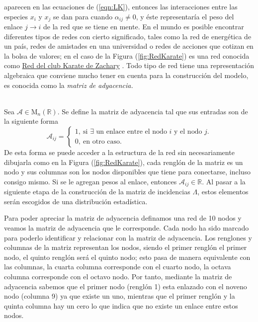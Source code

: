 aparecen en las ecuaciones de (\ref{eqn:LK}), entonces las interacciones entre las especies $x_i$ y $x_j$ se dan para cuando $\alpha_{ij}\neq 0$, y éste representaría el peso del enlace $j\to i$ de la red que se tiene en mente. En el mundo es posible encontrar diferentes tipos de redes con cierto significado, tales como la red de energética de un país, redes de amistades en una universidad o redes de acciones que cotizan en la bolsa de valores; en el caso de la Figura (\ref{fig:RedKarate}) es una red conocida como \href{https://en.wikipedia.org/wiki/Zachary%27s_karate_club}{Red del club Karate de Zachary} \cite{newman2018networks}. Todo tipo de red tiene una representación algebraica que conviene mucho tener en cuenta para la construcción del modelo, es conocida como la \textit{matriz de adyacencia.}\\
\\
\begin{definición}\label{def:matrizdeadyacencia}
	Sea $\mathcal{A}\in\mathrm{M}_n(\mathbb{R}) $. Se define la matriz de adyacencia tal que sus entradas son de la siguiente forma
	$$\mathcal{A}_{ij}= 
	\begin{cases}
		1, \ \text{si $\exists$ un enlace entre el nodo $i$ y el nodo $j$.}\\
		0, \ \text{en otro caso}.
	\end{cases}$$
	De esta forma se puede acceder a la estructura de la red sin necesariamente dibujarla como en la Figura (\ref{fig:RedKarate}), cada renglón de la matriz es un nodo y sus columnas son los nodos disponibles que tiene para conectarse, incluso consigo mismo. Si se le agregan pesos al enlace, entonces $\mathcal{A}_{ij}\in\mathbb{R}$. Al pasar a la siguiente etapa de la construcción de la matriz de incidencias $\Lambda$, estos elementos serán escogidos de una distribución estadística. 
\end{definición}
\begin{ejemplo}
	Para poder apreciar la matriz de adyacencia definamos una red de 10 nodos y veamos la matriz de adyacencia que le corresponde. Cada nodo ha sido marcado para poderlo identificar y relacionar con la matriz de adyacencia. Los renglones y columnas de la matriz representan los nodos, siendo el primer renglón el primer nodo, el quinto renglón será el quinto nodo; esto pasa de manera equivalente con las columnas, la cuarta columna corresponde con el cuarto nodo, la octava columna corresponde con el octavo nodo. Por tanto, mediante la matriz de adyacencia sabemos que el primer nodo (renglón 1) esta enlazado con el noveno nodo (columna 9) ya que existe un uno, mientras que el primer renglón y la quinta columna hay un cero lo que indica que no existe un enlace entre estos nodos. 
\end{ejemplo}
